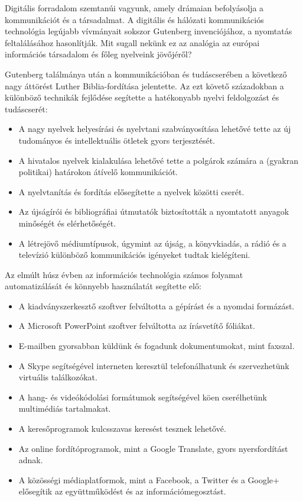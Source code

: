   \begin{multicols}{2}

  Digitális forradalom szemtanúi vagyunk, amely drámaian befolyásolja a kommunikációt és a társadalmat. A digitális és hálózati kommunikációs technológia legújabb vívmányait sokszor Gutenberg invenciójához, a nyomtatás feltalálásához hasonlítják. Mit sugall nekünk ez az analógia az európai információs társadalom és főleg nyelveink jövőjéről? 


  Gutenberg találmánya után a kommunikációban és tudáscserében a következő nagy áttörést Luther Biblia-fordítása jelentette. Az ezt követő századokban a különböző technikák fejlődése segítette a hatékonyabb nyelvi feldolgozást és tu\-dás\-cse\-rét:

  \medskip
  \begin{itemize}
  \item A nagy nyelvek helyesírási és nyelvtani szabványosítása lehetővé tette az új tudományos és intellektuális ötletek gyors terjesztését.
  \item A hivatalos nyelvek kialakulása le\-he\-tő\-vé tette a polgárok számára a (gyakran politikai) határokon átívelő kommunikációt.
  \item A nyelvtanítás és fordítás elősegítette a nyelvek közötti cserét.
  \item Az újságírói és bibliográfiai útmutatók biztosították a nyomtatott anyagok minőségét és elérhetőségét.
  \medskip
  \item A létrejövő médiumtípusok, úgymint az újság, a könyvkiadás, a rádió és a televízió különböző kommunikációs igényeket tudtak kielégíteni.
  \end{itemize}

  Az elmúlt húsz évben az információs technológia számos folyamat automatizálását és könnyebb használatát segítette elő:

  \begin{itemize}
  \item A kiadványszerkesztő szoftver felváltotta a gépírást és a nyomdai formázást.
  \item A Microsoft PowerPoint szoftver felváltotta az írásvetítő fóliákat.
  \item E-mailben gyorsabban küldünk és fogadunk dokumentumokat, mint faxszal.
  \item A Skype segítségével interneten ke\-resz\-tül telefonálhatunk és szer\-vez\-he\-tünk virtuális találkozókat.
  \item A hang- és videókódolási formátumok segítségével köen cserélhetünk multimédiás tartalmakat.
  \item A keresőprogramok kulcsszavas ke\-re\-sést tesznek lehetővé.
  \item Az online fordítóprogramok, mint a Google Translate, gyors nyersfordítást adnak.
  \item A közösségi médiaplatformok, mint a Facebook, a Twitter és a Google+ elősegítik az együttműködést és az információmegosztást.
  \end{itemize}


\end{multicols}
